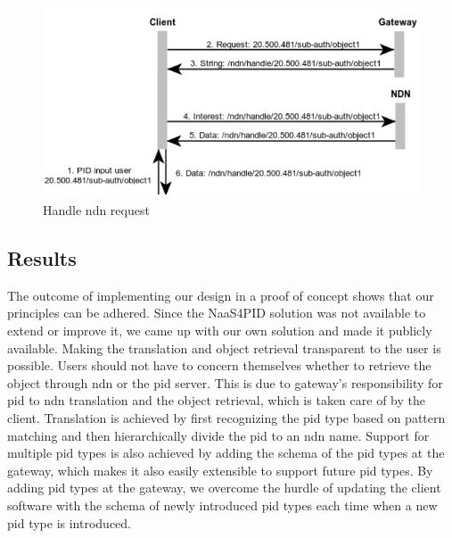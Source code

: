 \begin{figure}[H]
\includegraphics[scale=0.75]{Images/ndn_req.png}
\caption{Handle \gls{ndn} request}
\label{fig:seq_ndn}
\end{figure}


\subsection{Results}\label{results-pid}
The outcome of implementing our design in a proof of concept shows that our principles can be adhered. Since the NaaS4PID solution was not available to extend or improve it, we came up with our own solution and made it publicly available. Making the translation and object retrieval transparent to the user is possible. Users should not have to concern themselves whether to retrieve the object through \gls{ndn} or the \gls{pid} server. This is due to gateway's responsibility for \gls{pid} to \gls{ndn} translation and the object retrieval, which is taken care of by the client. 
Translation is achieved by first recognizing the \gls{pid} type based on pattern matching and then hierarchically divide the \gls{pid} to an \gls{ndn} name. Support for multiple \gls{pid} types is also achieved by adding the schema of the \gls{pid} types at the gateway, which makes it also easily extensible to support future \gls{pid} types. By adding \gls{pid} types at the gateway, we overcome the hurdle of updating the client software with the schema of newly introduced \gls{pid} types each time when a new \gls{pid} type is introduced.




